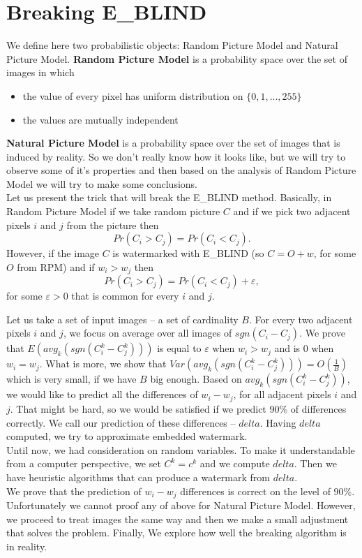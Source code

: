 \documentclass[a4paper,12pt]{article}
\begin{document}
\section{Breaking E\_BLIND}

We define here two probabilistic objects: Random Picture Model and
Natural Picture Model. \textbf{Random Picture Model} is a probability space over the set
of images in which
\begin{itemize}
  \item the value of every pixel has uniform distribution on $\{0, 1, ..., 255\}$
  \item the values are mutually independent
\end{itemize}
\textbf{Natural Picture Model} is a probability space over the set of images
that is induced by reality. So we don't really know how it looks like, but we
will try to observe some of it's properties and then based on the analysis of
Random Picture Model we will try to make some conclusions.\\
Let us present the trick that will break the E\_BLIND method. Basically, in
Random Picture Model if we take random picture $C$ and if we pick two
adjacent pixels $i$ and $j$ from the picture then
\begin{equation}
\label{trick1}
Pr(C_i > C_j) = Pr(C_i < C_j).
\end{equation}
However, if the image $C$ is watermarked with E\_BLIND (so $C = O + w$, for some $O$ from RPM) and if $w_i > w_j$ then
\begin{equation}
\label{trick2}
Pr(C_i > C_j) = Pr(C_i < C_j) + \varepsilon,
\end{equation}
for some $\varepsilon > 0$ that is common for every $i$ and $j$.

Let us take a set of input images -- a set of cardinality $B$. For every two
adjacent pixels $i$ and $j$, we focus on average over all images of
$sgn(C_i-C_j)$. We prove that $E(avg_k(sgn(C^k_i-C^k_j)))$ is equal to
$\varepsilon$ when $w_i > w_j$ and is $0$ when $w_i = w_j$. What is more,  we
show that $Var(avg_k(sgn(C^k_i-C^k_j))) = O\left(\frac{1}{B}\right)$ which is
very small, if we have $B$ big enough. Based on $avg_k(sgn(C^k_i-C^k_j))$, we
would like to predict all the differences of $w_i-w_j$, for all adjacent pixels
$i$ and $j$. That might be hard, so we would be satisfied if we predict $90$\% of
differences correctly. We call our prediction of these differences --
$delta$. Having $delta$ computed, we try to approximate embedded watermark.\\
Until now, we had consideration on random variables. To make it understandable
from a computer perspective, we set $C^k = c^k$ and we compute $delta$. Then we
have heuristic algorithms that can produce a watermark from $delta$.\\
We prove that the prediction of $w_i-w_j$ differences is correct on the level of $90$\%.
Unfortunately we cannot proof any of above for Natural Picture Model. However,
we proceed to treat images the same way and then we make a small
adjustment that solves the problem. Finally, We explore how well the
breaking algorithm is in reality.\\
\end{document}
